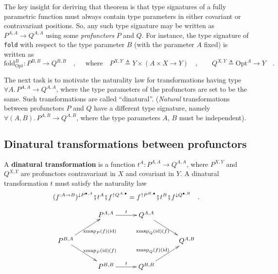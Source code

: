 The key insight for deriving that theorem is that type signatures
of a fully parametric function must always contain type parameters
in either covariant or contravariant positions. So, any such type
signature may be written as $P^{A,A}\rightarrow Q^{A,A}$ using some
\emph{profunctors} $P$ and $Q$. For instance, the type signature
of \lstinline!fold! with respect to the type parameter $B$ (with
the parameter $A$ fixed) is written as
\begin{equation}
\text{fold}_{\text{Opt}}^{B}:P^{B,B}\rightarrow Q^{B,B}\quad,\quad\text{ where}\quad P^{X,Y}\triangleq Y\times\left(A\times X\rightarrow Y\right)\quad,\quad\quad Q^{X,Y}\triangleq\text{Opt}^{A}\rightarrow Y\quad.\label{eq:fold-type-signature-via-profunctors-derivation1}
\end{equation}

The next task is to motivate the naturality law for transformations
having type $\forall A.\,P^{A,A}\rightarrow Q^{A,A}$, where the type
parameters of the profunctors are set to be the same. Such transformations
are called \textsf{``}dinatural\textsf{''}. (\emph{Natural} transformations between
profunctors $P$ and $Q$ have a different type signature, namely
$\forall(A,B).\,P^{A,B}\rightarrow Q^{A,B}$, where the type parameters
$A$, $B$ must be independent).

\subsection{Dinatural transformations between profunctors}

A \textbf{dinatural transformation}
is a function $t^{A}:P^{A,A}\rightarrow Q^{A,A}$, where $P^{X,Y}$
and $Q^{X,Y}$ are profunctors contravariant in $X$ and covariant
in $Y$. A dinatural transformation $t$ must satisfy the naturality
law
\begin{equation}
(f^{:A\rightarrow B})^{\downarrow P^{\bullet,A}}\bef t^{A}\bef f^{\uparrow Q^{A,\bullet}}=f^{\uparrow P^{B,\bullet}}\bef t^{B}\bef f^{\downarrow Q^{\bullet,B}}\quad.\label{eq:dinaturality-law-for-dinatural-transformations-of-profunctors}
\end{equation}

\begin{wrapfigure}{l}{0.43\columnwidth}%
\vspace{-2\baselineskip}
\[
\xymatrix{\xyScaleY{1.8pc}\xyScaleX{2.5pc} & P^{A,A}\ar[r]\sp(0.5){t} & Q^{A,A}\ar[rd]\sb(0.45){\text{xmap}_{Q}(\text{id})(f)}\\
P^{B,A}\ar[rd]\sp(0.55){\text{xmap}_{P}(\text{id})(f)}\ar[ru]\sb(0.55){\text{xmap}_{P}(f)(\text{id})} &  &  & Q^{A,B}\\
 & P^{B,B}\ar[r]\sp(0.5){t} & Q^{B,B}\ar[ru]\sp(0.45){\text{xmap}_{Q}(f)(\text{id})}
}
\]

\vspace{-0.7\baselineskip}
\end{wrapfigure}%

